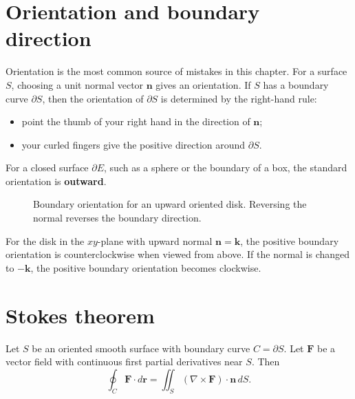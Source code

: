 \documentclass[11pt]{article}
\newcommand{\kk}{\mathbf k}
\newcommand{\vr}{\mathbf r}
\newcommand{\vn}{\mathbf n}
\newcommand{\vF}{\mathbf F}
\begin{document}
\section{Orientation and boundary direction}

Orientation is the most common source of mistakes in this chapter. For a surface $S$, choosing a unit normal vector $\vn$ gives an orientation. If $S$ has a boundary curve $\partial S$, then the orientation of $\partial S$ is determined by the right-hand rule:
\begin{itemize}
  \item point the thumb of your right hand in the direction of $\vn$;
  \item your curled fingers give the positive direction around $\partial S$.
\end{itemize}
For a closed surface $\partial E$, such as a sphere or the boundary of a box, the standard orientation is \textbf{outward}.

\begin{figure}[H]
\centering
{}
\caption{Boundary orientation for an upward oriented disk. Reversing the normal reverses the boundary direction.}
\end{figure}

For the disk in the $xy$-plane with upward normal $\vn=\kk$, the positive boundary orientation is counterclockwise when viewed from above. If the normal is changed to $-\kk$, the positive boundary orientation becomes clockwise.

\section{Stokes theorem}

\begin{theorembox}
Let $S$ be an oriented smooth surface with boundary curve $C=\partial S$. Let $\vF$ be a vector field with continuous first partial derivatives near $S$. Then
\[
\oint_C \vF\cdot d\vr
=
\iint_S (\nabla\times\vF)\cdot\vn\,dS.
\]
\end{theorembox}
\end{document}
